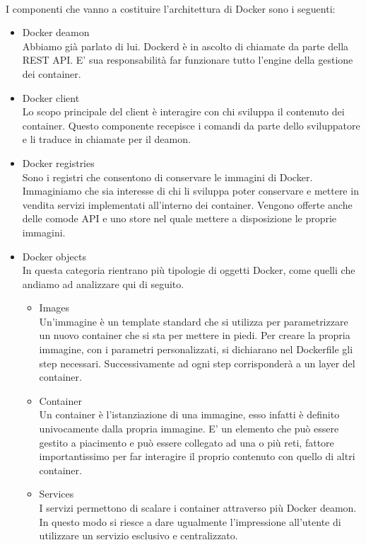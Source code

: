 \paragraph{}
I componenti che vanno a costituire l'architettura di Docker sono i seguenti:
\begin{itemize}
	\item Docker deamon \\
	Abbiamo già parlato di lui. Dockerd è in ascolto di chiamate da parte della REST API. E' sua responsabilità far funzionare tutto l'engine della gestione dei container.
	\item Docker client \\
	Lo scopo principale del client è interagire con chi sviluppa il contenuto dei container. Questo componente recepisce i comandi da parte dello sviluppatore e li traduce in chiamate per il deamon.
	\item Docker registries \\
	Sono i registri che consentono di conservare le immagini di Docker. Immaginiamo che sia interesse di chi li sviluppa poter conservare e mettere in vendita servizi implementati all'interno dei container. Vengono offerte anche delle comode API e uno store nel quale mettere a disposizione le proprie immagini.
	\item  Docker objects \\
	In questa categoria rientrano più tipologie di oggetti Docker, come quelli che andiamo ad analizzare qui di seguito. \begin{itemize}
		\item  Images \\
		Un'immagine è un template standard che si utilizza per parametrizzare un nuovo container che si sta per mettere in piedi. Per creare la propria immagine, con i parametri personalizzati, si dichiarano nel Dockerfile gli step necessari. Successivamente ad ogni step corrisponderà a un layer del container.
		\item  Container \\
		Un container è l'istanziazione di una immagine, esso infatti è definito univocamente dalla propria immagine. E' un elemento che può essere gestito a piacimento e può essere collegato ad una o più reti, fattore importantissimo per far interagire il proprio contenuto con quello di altri container.
		\item Services \\
		I servizi permettono di scalare i container attraverso più Docker deamon. In questo modo si riesce a dare ugualmente l'impressione all'utente di utilizzare un servizio esclusivo e centralizzato.
	\end{itemize}
\end{itemize}

